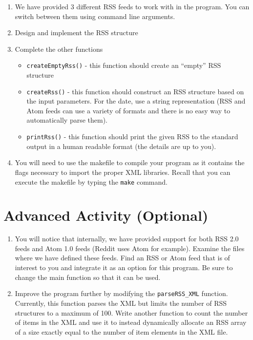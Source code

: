 \documentclass[12pt]{scrartcl}
\begin{document}
\begin{enumerate}
  \item We have provided 3 different RSS feeds to work with in the
    program.  You can switch between them using command line arguments.
  \item Design and implement the RSS structure 
  \item Complete the other functions
  \begin{itemize}
    \item \texttt{createEmptyRss()} - this function should create an 
  	``empty'' RSS structure
    \item \texttt{createRss()} - this function should construct an RSS 
	structure based on the input parameters.  For the date, use a string
	representation (RSS and Atom feeds can use a variety of formats and
	there is no easy way to automatically parse them).
	\item \texttt{printRss()} - this function should print the given RSS 
	to the standard output in a human readable format (the details are up to you).  
  \end{itemize}	
  \item You will need to use the makefile to compile your program as it 
	contains the flags necessary to import the proper XML libraries.  
	Recall that you can execute the makefile by typing the \texttt{make} 
	command.
\end{enumerate}

\section{Advanced Activity (Optional)}

\begin{enumerate}
  \item You will notice that internally, we have provided support for both
  RSS 2.0 feeds and Atom 1.0 feeds (Reddit uses Atom for example).  
  Examine the files where we have defined these feeds.  Find an RSS or Atom
  feed that is of interest to you and integrate it as an option for this program.
  Be sure to change the main function so that it can be used.
  
  \item Improve the program further by modifying the \texttt{parseRSS_XML} 
	function.  Currently, this function parses the XML but limits the number of 
	RSS structures to a maximum of 100.  Write another function to count the 
	number of items in the XML and use it to instead dynamically allocate an 
	RSS array of a size exactly equal to the number of item elements in the XML file.
\end{enumerate}
\end{document}
